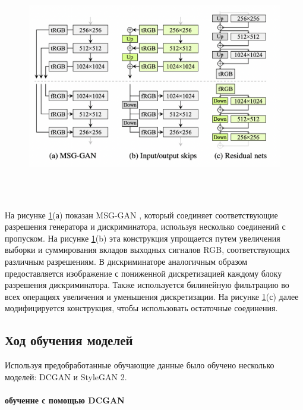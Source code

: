 \begin{figure}
    \centering
    \includegraphics[height=100mm]{fig/stylegan2_generator.png}
    \caption{}
    \label{fig.stylegan2_generator}
\end{figure}

На рисунке {\color{blue} \ref{fig.stylegan2_generator}}(а) показан MSG-GAN \cite{MSG_GAN}, который соединяет соответствующие разрешения генератора и дискриминатора, используя несколько соединений с пропуском. На рисунке {\color{blue} \ref{fig.stylegan2_generator}}(b) эта конструкция упрощается путем увеличения выборки и суммирования вкладов выходных сигналов RGB, соответствующих различным разрешениям. В дискриминаторе аналогичным образом предоставляется изображение с пониженной дискретизацией каждому блоку разрешения дискриминатора. Также используется билинейную фильтрацию во всех операциях увеличения и уменьшения дискретизации. На рисунке {\color{blue} \ref{fig.stylegan2_generator}}(с) далее модифицируется конструкция, чтобы использовать остаточные соединения\cite{StyleGAN2}.

\subsection{Ход обучения моделей}

Используя предобработанные обучающие данные было обучено несколько моделей: DCGAN и StyleGAN 2.

\paragraph{обучение с помощью DCGAN}

